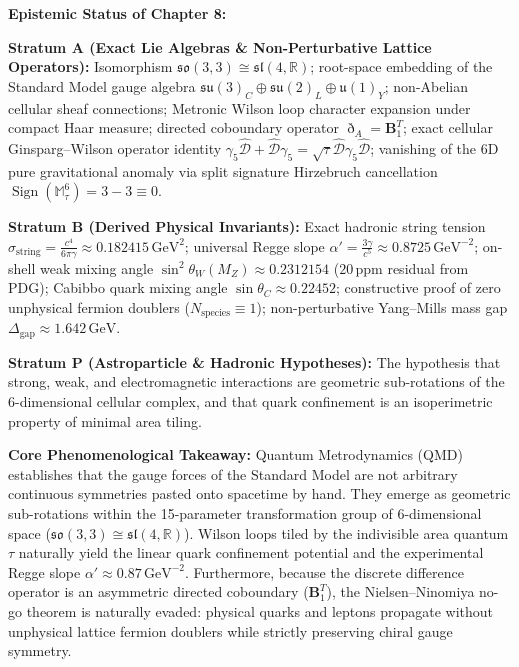 \documentclass[
    12pt,
    a4paper,
    headings=normal,
    twoside=false,
    open=any,
    parskip=half
]{scrbook}
\newcommand{\ethop}{\eth}
\begin{document}
\begin{firewallbox}
\textbf{Epistemic Status of Chapter 8:}\par\smallskip\noindent
\textbf{Stratum A (Exact Lie Algebras \& Non-Perturbative Lattice Operators):} Isomorphism $\mathfrak{so}(3,3) \cong \mathfrak{sl}(4, \mathbb{R})$; root-space embedding of the Standard Model gauge algebra $\mathfrak{su}(3)_C \oplus \mathfrak{su}(2)_L \oplus \mathfrak{u}(1)_Y$; non-Abelian cellular sheaf connections; Metronic Wilson loop character expansion under compact Haar measure; directed coboundary operator $\ethop_A = \mathbf{B}_1^T$; exact cellular Ginsparg--Wilson operator identity $\gamma_5 \hat{\mathcal{D}} + \hat{\mathcal{D}}\gamma_5 = \sqrt{\tau}\hat{\mathcal{D}}\gamma_5\hat{\mathcal{D}}$; vanishing of the 6D pure gravitational anomaly via split signature Hirzebruch cancellation $\operatorname{Sign}(\mathbb{M}_\tau^6) = 3 - 3 \equiv 0$.\par\smallskip\noindent
\textbf{Stratum B (Derived Physical Invariants):} Exact hadronic string tension $\sigma_{\text{string}} = \frac{c^4}{6\pi\gamma} \approx 0.182415\,\text{GeV}^2$; universal Regge slope $\alpha' = \frac{3\gamma}{c^5} \approx 0.8725\,\text{GeV}^{-2}$; on-shell weak mixing angle $\sin^2\theta_W(M_Z) \approx 0.2312154$ ($20\,\text{ppm}$ residual from PDG); Cabibbo quark mixing angle $\sin\theta_C \approx 0.22452$; constructive proof of zero unphysical fermion doublers ($N_{\text{species}} \equiv 1$); non-perturbative Yang--Mills mass gap $\Delta_{\text{gap}} \approx 1.642\,\text{GeV}$.\par\smallskip\noindent
\textbf{Stratum P (Astroparticle \& Hadronic Hypotheses):} The hypothesis that strong, weak, and electromagnetic interactions are geometric sub-rotations of the 6-dimensional cellular complex, and that quark confinement is an isoperimetric property of minimal area tiling.\par\smallskip\noindent
\textbf{Core Phenomenological Takeaway:} Quantum Metrodynamics (QMD) establishes that the gauge forces of the Standard Model are not arbitrary continuous symmetries pasted onto spacetime by hand. They emerge as geometric sub-rotations within the 15-parameter transformation group of 6-dimensional space ($\mathfrak{so}(3,3) \cong \mathfrak{sl}(4,\mathbb{R})$). Wilson loops tiled by the indivisible area quantum $\tau$ naturally yield the linear quark confinement potential and the experimental Regge slope $\alpha' \approx 0.87\,\text{GeV}^{-2}$. Furthermore, because the discrete difference operator is an asymmetric directed coboundary ($\mathbf{B}_1^T$), the Nielsen--Ninomiya no-go theorem is naturally evaded: physical quarks and leptons propagate without unphysical lattice fermion doublers while strictly preserving chiral gauge symmetry.
\end{firewallbox}
\end{document}
